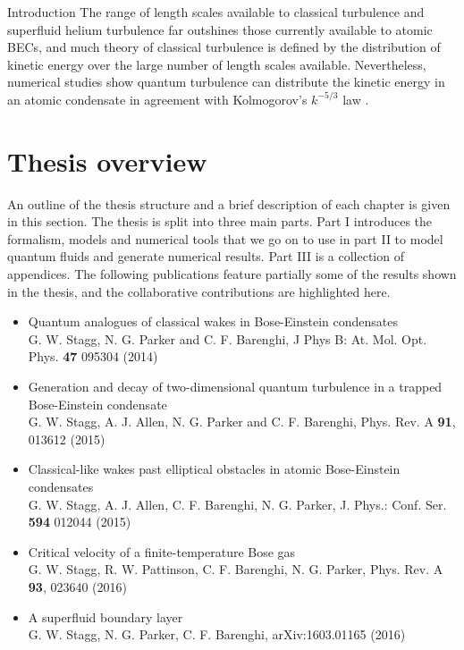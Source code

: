 \begin{chapter}{\label{cha:bose_gases}Introduction}
The range of length scales available to classical turbulence and superfluid helium turbulence far outshines those currently available to atomic BECs, and much theory of classical turbulence is defined by the distribution of kinetic energy over the large number of length scales available. Nevertheless, numerical studies show quantum turbulence can distribute the kinetic energy in an atomic condensate in agreement with Kolmogorov's $k^{-5/3}$ law \cite{Nore,Kobayashi,PhysRevLett.103.084501}.

\section{Thesis overview}
An outline of the thesis structure and a brief description of each chapter is given in this section. The thesis is split into three main parts. Part I introduces the formalism, models and numerical tools that we go on to use in part II to model quantum fluids and generate numerical results. Part III is a collection of appendices. The following publications feature partially some of the results shown in the thesis, and the collaborative contributions are highlighted here.
\begin{itemize}
	\item Quantum analogues of classical wakes in Bose-Einstein condensates\\
	{\footnotesize G. W. Stagg, N. G. Parker and C. F. Barenghi, J Phys B: At. Mol. Opt. Phys. {\bf 47} 095304 (2014)}
	\item Generation and decay of two-dimensional quantum turbulence in a trapped Bose-Einstein condensate\\
	{\footnotesize G. W. Stagg, A. J. Allen, N. G. Parker and C. F. Barenghi, Phys. Rev. A {\bf 91}, 013612 (2015)}
	\item Classical-like wakes past elliptical obstacles in atomic Bose-Einstein condensates\\
	{\footnotesize G. W. Stagg, A. J. Allen, C. F. Barenghi, N. G. Parker, J. Phys.: Conf. Ser. {\bf 594} 012044 (2015)}
	\item Critical velocity of a finite-temperature Bose gas\\
	{\footnotesize G. W. Stagg, R. W. Pattinson, C. F. Barenghi, N. G. Parker, Phys. Rev. A {\bf 93}, 023640 (2016)}
	\item A superfluid boundary layer\\
	{\footnotesize G. W. Stagg, N. G. Parker, C. F. Barenghi, arXiv:1603.01165 (2016)}
\end{itemize}


\end{chapter}
